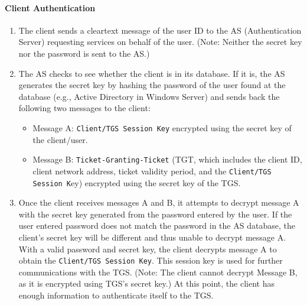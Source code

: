 \paragraph*{Client Authentication}

\begin{enumerate}
  \item The client sends a cleartext message of the user ID to the AS (Authentication Server) requesting services on behalf of the user. (Note: Neither the secret key nor the password is sent to the AS.)
  \item The AS checks to see whether the client is in its database. If it is, the AS generates the secret key by hashing the password of the user found at the database (e.g., Active Directory in Windows Server) and sends back the following two messages to the client:
        \begin{itemize}
          \item Message A: \texttt{Client/TGS Session Key} encrypted using the secret key of the client/user.
          \item Message B: \texttt{Ticket-Granting-Ticket} (TGT, which includes the client ID, client network address, ticket validity period, and the \texttt{Client/TGS Session K}ey) encrypted using the secret key of the TGS.
        \end{itemize}
  \item Once the client receives messages A and B, it attempts to decrypt message A with the secret key generated from the password entered by the user. If the user entered password does not match the password in the AS database, the client's secret key will be different and thus unable to decrypt message A. With a valid password and secret key, the client decrypts message A to obtain the \texttt{Client/TGS Session Key}. This session key is used for further communications with the TGS. (Note: The client cannot decrypt Message B, as it is encrypted using TGS's secret key.) At this point, the client has enough information to authenticate itself to the TGS.
\end{enumerate}



